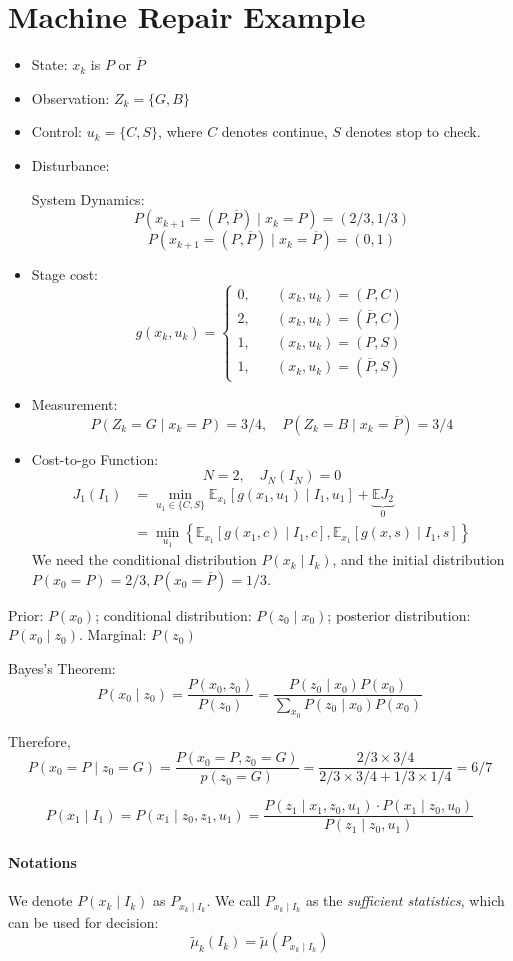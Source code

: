 \section{Machine Repair 
Example}
\begin{itemize}
\item
State: $x_k$ is $P$ or $\overline{P}$
\item
Observation: $Z_k = \{G,B\}$
\item
Control: $u_k = \{C,S\}$, where $C$ denotes continue, $S$ denotes stop to check.
\item
Disturbance:

System Dynamics:
\[
P(x_{k+1}=(P,\overline{P})\mid x_k=P)=(2/3,1/3)
\]
\[
P(x_{k+1} = (P,\overline{P})\mid x_k=\overline{P})=(0,1)
\]
\item
Stage cost:
\[
g(x_k,u_k) = \left\{
\begin{aligned}
0,&\quad(x_k,u_k)=(P,C)\\
2,&\quad(x_k,u_k)=(\overline{P},C)\\
1,&\quad(x_k,u_k) = (P,S)\\
1,&\quad(x_k,u_k)=(\overline{P},S)
\end{aligned}
\right.
\]
\item
Measurement:
\[
P(Z_k=G\mid x_k=P)=3/4,\quad
P(Z_k=B\mid x_k=\overline{P})=3/4
\]
\item
Cost-to-go Function:
\[
N=2,\quad
J_N(I_N)=0
\]
\begin{align*}
J_1(I_1) &= \min_{u_1\in\{C,S\}}\mathbb{E}_{x_1}[g(x_1,u_1)\mid I_1,u_1]+\underbrace{\mathbb{E}J_2}_{0}\\
&=
\min_{u_1}\left\{
\mathbb{E}_{x_1}[g(x_1,c)\mid I_1,c]
,
\mathbb{E}_{x_1}[g(x,s)\mid I_1,s]
\right\}
\end{align*}
We need the conditional distribution $P(x_k\mid I_k)$, and the initial distribution $P(x_0=P)=2/3,P(x_0=\overline{P})=1/3$.
\end{itemize}
Prior: $P(x_0)$; conditional distribution: $P(z_0\mid x_0)$; posterior distribution: $P(x_0\mid z_0)$. Marginal: $P(z_0)$

Bayes's Theorem:
\[
P(x_0\mid z_0) = \frac{P(x_0,z_0)}{P(z_0)}
=
\frac{P(z_0\mid x_0)P(x_0)}{\sum_{x_0}P(z_0\mid x_0)P(x_0)}
\]

Therefore,
\[
P(x_0=P\mid z_0=G) = \frac{P(x_0=P,z_0=G)}{p(z_0=G)}
=
\frac{2/3\times 3/4}{2/3\times 3/4+1/3\times1/4}=6/7
\]

\[
P(x_1\mid I_1)
=P(x_1\mid z_0,z_1,u_1)
=
\frac{P(z_1\mid x_1,z_0,u_1)\cdot P(x_1\mid z_0,u_0)}{P(z_1\mid z_0,u_1)}
\]
\paragraph{Notations}
We denote $P(x_k\mid I_k)$ as $P_{x_k\mid I_k}$.
We call $P_{x_k\mid I_k}$ as the \emph{sufficient statistics}, which can be used for decision:
\[
\tilde{\mu}_k(I_k)=\tilde{\mu}(P_{x_k\mid I_k})
\]

